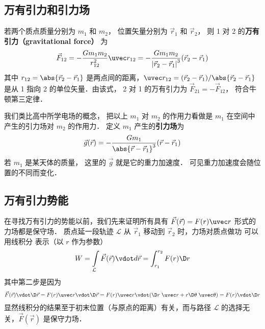 

\subsection{万有引力和引力场}

若两个质点质量分别为 $m_1$ 和 $m_2$， 位置矢量分别为 $\vec r_1$ 和 $\vec r_2$， 则 1 对 2 的\textbf{万有引力（gravitational force）} 为
\begin{equation}\label{Gravty_eq1}
{\vec F_{12}} =  - \frac{{G{m_1}{m_2}}}{{{r_{12}^2}}}{\uvec r_{12}} = - \frac{{G{m_1}{m_2}}}{{{{\left| {{{\vec r}_2} - {{\vec r}_1}} \right|}^3}}}({\vec r_2} - {\vec r_1})
\end{equation}
其中 $r_{12} = \abs{\vec r_2 - \vec r_1}$ 是两点间的距离，$\uvec r_{12} = (\vec r_2 - \vec r_1)/\abs{\vec r_2 - \vec r_1}$ 是从 1 指向 2 的单位矢量．由该式， 2 对 1 的万有引力为 $\vec F_{21} = -\vec F_{12}$， 符合牛顿第三定律．

我们类比高中所学电场的概念， 把以上 $m_1$ 对 $m_2$ 的作用力看做是 $m_1$ 在空间中产生的引力场对 $m_2$ 的作用力． 定义 $m_1$ 产生的\textbf{引力场}为
\begin{equation}\label{Gravty_eq2}
\vec g(\vec r) = -\frac{Gm_1}{\abs{\vec r - \vec r_1} ^3}(\vec r - \vec r_1)
\end{equation}
若 $m_1$ 是某天体的质量， 这里的 $\vec g$ 就是它的重力加速度． 可见重力加速度会随位置的不同而变化．

\subsection{万有引力势能}
在寻找万有引力的势能以前，我们先来证明所有具有 $\vec F(\vec r) = F(r) \uvec r$ 形式的力场都是保守场． 质点延一段轨迹 $\mathcal{L}$ 从 $\vec r_1$ 移动到 $\vec r_2$ 时，力场对质点做功 可以用线积分 表示（以 $r$ 作为参数）
\begin{equation}
W = \int\limits_\mathcal{L} {\vec F(\vec r) \vdot d\vec r} = \int_{{r_1}}^{{r_2}} {F(r) \D r} 
\end{equation}
其中第二步是因为
\begin{equation}
\vec F(\vec r) \vdot \D\vec r = F(r)\uvec r \vdot \D\vec r = F(r)\uvec  r \vdot (\D r\;\uvec  r + r\D\theta \;\uvec  \theta ) = F(r) \vdot \D r
\end{equation}
显然线积分的结果至于初末位置（与原点的距离）有关，而与路径 $\mathcal{L}$ 的选择无关，$\vec F(\vec r)$ 是保守力场．

